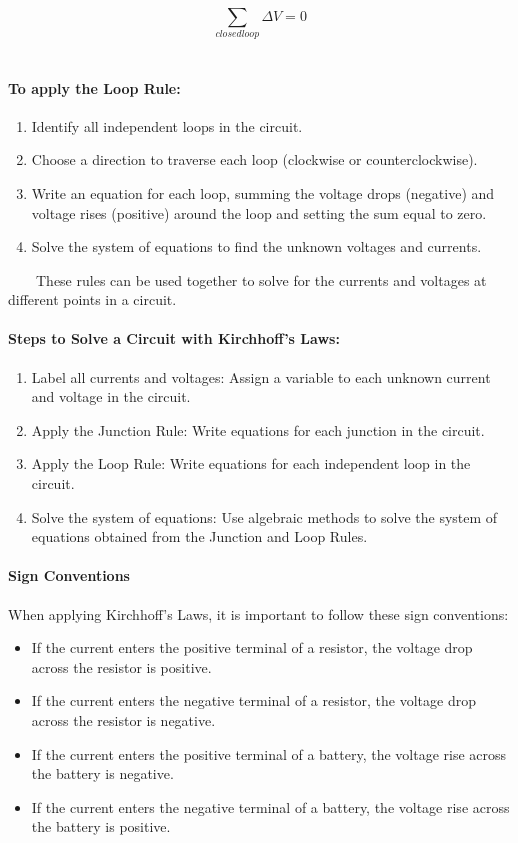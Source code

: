 \begin{equation*}
    \sum_{closed loop} \Delta V = 0
\end{equation*}\\

\paragraph*{To apply the Loop Rule:}
\begin{enumerate}
    \item Identify all independent loops in the circuit.
    \item Choose a direction to traverse each loop (clockwise or counterclockwise).
    \item Write an equation for each loop, summing the voltage drops (negative) and voltage rises (positive) around the loop and setting the sum equal to zero.
    \item Solve the system of equations to find the unknown voltages and currents.
\end{enumerate}

\ \ \ \ These rules can be used together to solve for the currents and voltages at different points in a circuit.

\hrulefill

\paragraph*{Steps to Solve a Circuit with Kirchhoff's Laws:}
\begin{enumerate}
    \item Label all currents and voltages: Assign a variable to each unknown current and voltage in the circuit.
    \item Apply the Junction Rule: Write equations for each junction in the circuit.
    \item Apply the Loop Rule: Write equations for each independent loop in the circuit.
    \item Solve the system of equations: Use algebraic methods to solve the system of equations obtained from the Junction and Loop Rules.
\end{enumerate}

\paragraph*{Sign Conventions}
When applying Kirchhoff's Laws, it is important to follow these sign conventions:
\begin{itemize}
    \item If the current enters the positive terminal of a resistor, the voltage drop across the resistor is positive.
    \item If the current enters the negative terminal of a resistor, the voltage drop across the resistor is negative.
    \item If the current enters the positive terminal of a battery, the voltage rise across the battery is negative.
    \item If the current enters the negative terminal of a battery, the voltage rise across the battery is positive.
\end{itemize}

